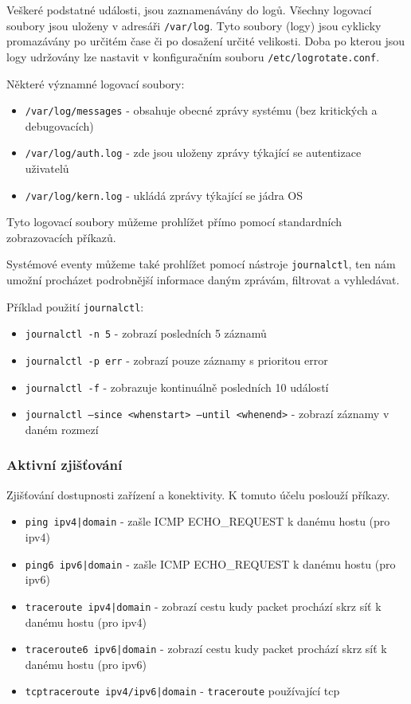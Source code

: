 Veškeré podstatné události, jsou zaznamenávány do logů. Všechny logovací soubory jsou uloženy v adresáři \texttt{/var/log}. Tyto soubory (logy) jsou cyklicky promazávány po určitém čase či po dosažení určité velikosti. Doba po kterou jsou logy udržovány lze nastavit v konfiguračním souboru \texttt{/etc/logrotate.conf}.

Některé významné logovací soubory:
\begin{itemize}
				\item \texttt{/var/log/messages} - obsahuje obecné zprávy systému (bez kritických a debugovacích)
				\item \texttt{/var/log/auth.log} - zde jsou uloženy zprávy týkající se autentizace uživatelů
				\item \texttt{/var/log/kern.log} - ukládá zprávy týkající se jádra OS
\end{itemize}

Tyto logovací soubory můžeme prohlížet přímo pomocí standardních zobrazovacích příkazů.

Systémové eventy můžeme také prohlížet pomocí nástroje \texttt{journalctl}, ten nám umožní procházet podrobnější informace daným zprávám, filtrovat a vyhledávat.

Příklad použití \texttt{journalctl}:
\begin{itemize}
				\item \texttt{journalctl -n 5} - zobrazí posledních 5 záznamů
				\item \texttt{journalctl -p err} - zobrazí pouze záznamy s prioritou error
				\item \texttt{journalctl -f} - zobrazuje kontinuálně posledních 10 událostí
				\item \texttt{journalctl --since <whenstart> --until <whenend>} - zobrazí záznamy v daném rozmezí
\end{itemize}


\subsubsection{Aktivní zjišťování}
Zjišťování dostupnosti zařízení a konektivity. K tomuto účelu poslouží příkazy.

\begin{itemize}
				\item \texttt{ping ipv4|domain} - zašle ICMP ECHO\_REQUEST k danému hostu (pro ipv4)
				\item \texttt{ping6 ipv6|domain} - zašle ICMP ECHO\_REQUEST k danému hostu (pro ipv6)
				\item \texttt{traceroute ipv4|domain} - zobrazí cestu kudy packet prochází skrz síť k danému hostu (pro ipv4)
				\item \texttt{traceroute6 ipv6|domain} - zobrazí cestu kudy packet prochází skrz síť k danému hostu (pro ipv6)
				\item \texttt{tcptraceroute ipv4/ipv6|domain} - \texttt{traceroute} používající tcp
\end{itemize}

